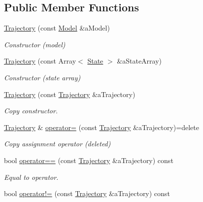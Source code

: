 \subsection*{Public Member Functions}
\begin{DoxyCompactItemize}
\item 
\hyperlink{classostk_1_1astro_1_1_trajectory_a9333200bd6afed5aef4f5aad8a2a8e84}{Trajectory} (const \hyperlink{classostk_1_1astro_1_1trajectory_1_1_model}{Model} \&a\+Model)
\begin{DoxyCompactList}\small\item\em Constructor (model) \end{DoxyCompactList}\item 
\hyperlink{classostk_1_1astro_1_1_trajectory_a5bffa48518940b06d353988efdeb098a}{Trajectory} (const Array$<$ \hyperlink{classostk_1_1astro_1_1trajectory_1_1_state}{State} $>$ \&a\+State\+Array)
\begin{DoxyCompactList}\small\item\em Constructor (state array) \end{DoxyCompactList}\item 
\hyperlink{classostk_1_1astro_1_1_trajectory_a2a7642fa6183da49b5def83f63f08c42}{Trajectory} (const \hyperlink{classostk_1_1astro_1_1_trajectory}{Trajectory} \&a\+Trajectory)
\begin{DoxyCompactList}\small\item\em Copy constructor. \end{DoxyCompactList}\item 
\hyperlink{classostk_1_1astro_1_1_trajectory}{Trajectory} \& \hyperlink{classostk_1_1astro_1_1_trajectory_aeefb959ee88abfd6547e9cf4e462ca3e}{operator=} (const \hyperlink{classostk_1_1astro_1_1_trajectory}{Trajectory} \&a\+Trajectory)=delete
\begin{DoxyCompactList}\small\item\em Copy assignment operator (deleted) \end{DoxyCompactList}\item 
bool \hyperlink{classostk_1_1astro_1_1_trajectory_a13b1a0621195ed85aa3df0da5ae935f2}{operator==} (const \hyperlink{classostk_1_1astro_1_1_trajectory}{Trajectory} \&a\+Trajectory) const
\begin{DoxyCompactList}\small\item\em Equal to operator. \end{DoxyCompactList}\item 
bool \hyperlink{classostk_1_1astro_1_1_trajectory_abb524dcee260456d546f5e01ee9c228c}{operator!=} (const \hyperlink{classostk_1_1astro_1_1_trajectory}{Trajectory} \&a\+Trajectory) const

\end{DoxyCompactItemize}
